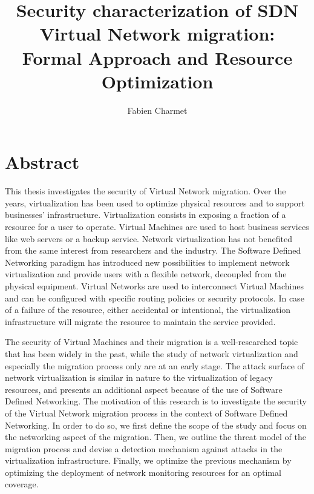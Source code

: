 \documentclass[a4paper, 11pt]{report}
\title{\LARGE \bf Security characterization of SDN Virtual Network migration:\\ Formal Approach and Resource Optimization}
\author{Fabien Charmet}
\theoremstyle{definition}
\begin{document}
% 

\maketitle
\chapter*{Abstract}
This thesis investigates the security of Virtual Network migration. Over the years, virtualization has been used to optimize physical resources and to support businesses’ infrastructure. Virtualization consists in exposing a fraction of a resource for a user to operate. Virtual Machines are used to host business services like web servers or a backup service. Network virtualization has not benefited from the same interest from researchers and the industry. The Software Defined Networking paradigm has introduced new possibilities to implement network virtualization and provide users with a flexible network, decoupled from the physical equipment. Virtual Networks are used to interconnect Virtual Machines and can be configured with specific routing policies or security protocols. In case of a failure of the resource, either accidental or intentional, the virtualization infrastructure will migrate the resource to maintain the service provided.

The security of Virtual Machines and their migration is a well-researched topic that has been widely in the past, while the study of network virtualization and especially the migration process only are at an early stage. The attack surface of network virtualization is similar in nature to the virtualization of legacy resources, and presents an additional aspect because of the use of Software Defined Networking.
The motivation of this research is to investigate the security of the Virtual Network migration process in the context of Software Defined Networking. In order to do so, we first define the scope of the study and focus on the networking aspect of the migration. Then, we outline the threat model of the migration process and devise a detection mechanism against attacks in the virtualization infrastructure. Finally, we optimize the previous mechanism by optimizing the deployment of network monitoring resources for an optimal coverage.
    
\end{document}
